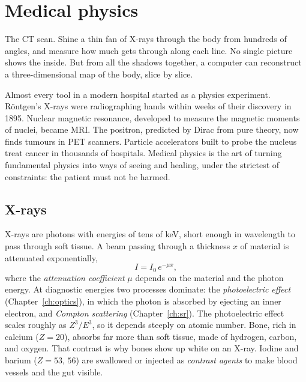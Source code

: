 \chapter{Medical physics}
\label{ch:medical}



\begin{prototype}
The CT scan. Shine a thin fan of X-rays through the body from hundreds of angles, and measure how much gets through along each line. No single picture shows the inside. But from all the shadows together, a computer can reconstruct a three-dimensional map of the body, slice by slice.
\end{prototype}

Almost every tool in a modern hospital started as a physics experiment. R\"ontgen's X-rays were radiographing hands within weeks of their discovery in 1895. Nuclear magnetic resonance, developed to measure the magnetic moments of nuclei, became MRI. The positron, predicted by Dirac from pure theory, now finds tumours in PET scanners. Particle accelerators built to probe the nucleus treat cancer in thousands of hospitals. Medical physics is the art of turning fundamental physics into ways of seeing and healing, under the strictest of constraints: the patient must not be harmed.

\section{X-rays}

X-rays are photons with energies of tens of keV, short enough in wavelength to pass through soft tissue. A beam passing through a thickness $x$ of material is attenuated exponentially,
\[
  I = I_0\,e^{-\mu x},
\]
where the \emph{attenuation coefficient} $\mu$ depends on the material and the photon energy. At diagnostic energies two processes dominate: the \emph{photoelectric effect} (Chapter~\ref{ch:optics}), in which the photon is absorbed by ejecting an inner electron, and \emph{Compton scattering} (Chapter~\ref{ch:sr}). The photoelectric effect scales roughly as $Z^3/E^3$, so it depends steeply on atomic number. Bone, rich in calcium ($Z = 20$), absorbs far more than soft tissue, made of hydrogen, carbon, and oxygen. That contrast is why bones show up white on an X-ray. Iodine and barium ($Z = 53$, $56$) are swallowed or injected as \emph{contrast agents} to make blood vessels and the gut visible.

